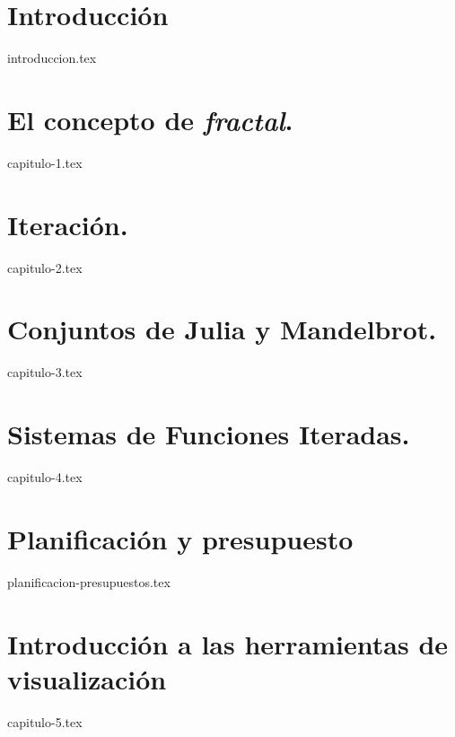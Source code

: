 \documentclass[11pt]{report}
\begin{document}

\chapter*{Introducción}
\setcounter{page}{1}


{introduccion.tex}


\chapter{El concepto de \textit{fractal}.}
\label{chap:concepto}

{capitulo-1.tex}

\chapter{Iteración.}
\label{chap:iteracion}

{capitulo-2.tex}


\chapter{Conjuntos de Julia y Mandelbrot.}
\label{chap:Julia-Mandelbrot}

{capitulo-3.tex}

\chapter{Sistemas de Funciones Iteradas.}
\label{chap:SFI}

{capitulo-4.tex}

\chapter*{Planificación y presupuesto}
\label{chap:planificacion-presupuesto}

{planificacion-presupuestos.tex}

\chapter{Introducción a las herramientas de visualización}
\label{chap:visualizacion}

{capitulo-5.tex}
\end{document}
